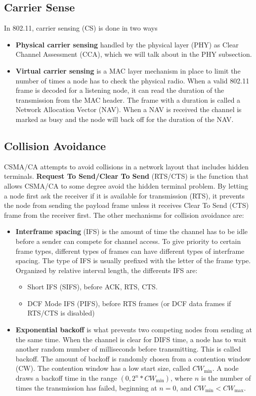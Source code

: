      \subsection{Carrier Sense}
     In 802.11, carrier sensing (CS) is done in two ways
     \begin{itemize}
     \item \textbf{Physical carrier sensing} handled by the physical layer (PHY) as Clear Channel Assessment (CCA), which we will talk about in the PHY subsection.
     \item \textbf{Virtual carrier sensing} is a MAC layer mechanism in place to limit the number of times
     a node has to check the physical radio. When a valid 802.11 frame is decoded for a listening node, it can read the duration of
     the transmission from the MAC header. The frame with a duration is called a Network Allocation Vector (NAV). When a NAV is received 
     the channel is marked as busy and the node will back off for the duration of the NAV. 
     \end{itemize} 


     \subsection{Collision Avoidance}
CSMA/CA attempts to avoid collisions in a network layout that includes hidden terminals. \textbf{Request To Send/Clear To Send} (RTS/CTS)
	is the function that allows CSMA/CA to some degree avoid the hidden terminal problem. By letting a node first ask the receiver if it is
	available for transmission (RTS), it prevents the node from sending the payload frame unless it receives Clear To Send (CTS) frame from the receiver first.
	The other mechanisms for collision avoidance are: 
	\begin{itemize}	
	\item \textbf{Interframe spacing} (IFS) is the amount of time the channel has to be idle before a sender can compete for channel access. 
	To give priority to certain frame types, different types of frames can have different types of interframe spacing. The type of IFS is usually 
	prefixed with the letter of the frame type. Organized by relative interval length, the differents IFS are:
	\begin{itemize} 
	\item Short IFS (SIFS), before ACK, RTS, CTS.  
\item DCF Mode IFS (PIFS), before RTS frames (or DCF data frames if RTS/CTS is disabled)

	\end{itemize}
	\item \textbf{Exponential backoff} is what prevents two competing nodes from sending at the same time. When the channel is clear
	for DIFS time, a node has to wait another  random number of milliseconds before transmitting. This is called backoff.
	The amount of backoff is randomly chosen from a contention window (CW). The contention window has a low start size,
	called $CW_{\text{min}}$. A node draws a backoff time in the range $(0, 2^n*CW_{\text{min}})$, where $n$ is the number 
	of times the transmission has failed, beginning at $n=0$, and $CW_{\text{min}}<CW_{\text{max}}$.
	\end{itemize}

